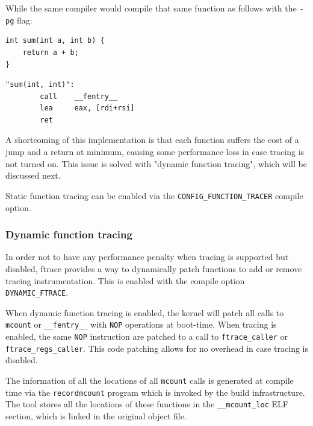 \noindent
\vspace{0.5em}

While the same compiler would compile that same function as follows with the
\verb|-pg| flag:

\vspace{0.5em}

\begin{minipage}[t]{0.47\textwidth}
\begin{verbatim}
int sum(int a, int b) {
    return a + b;
}
\end{verbatim}
\end{minipage}%
\hfill
\vrule %
\hfill
\begin{minipage}[t]{0.47\textwidth}
\begin{verbatim}
"sum(int, int)":
        call    __fentry__
        lea     eax, [rdi+rsi]
        ret
\end{verbatim}
\end{minipage}

\vspace{0.5em}

A shortcoming of this implementation is that each function suffers the cost of a
jump and a return at minimum, causing some performance loss in case tracing is
not turned on. This issue is solved with "dynamic function tracing", which will
be discussed next.

Static function tracing can be enabled via the \verb|CONFIG_FUNCTION_TRACER|
compile option.

\subsubsection*{Dynamic function tracing}

In order not to have any performance penalty when tracing is supported but
disabled, ftrace provides a way to dynamically patch functions to add or remove
tracing instrumentation. This is enabled with the compile option
\verb|DYNAMIC_FTRACE|.

When dynamic function tracing is enabled, the kernel will patch all calls to
\verb|mcount| or \verb|__fentry__| with \verb|NOP| operations at boot-time. When
tracing is enabled, the same \verb|NOP| instruction are patched to a call to
\verb|ftrace_caller| or \verb|ftrace_regs_caller|. This code patching allows for
no overhead in case tracing is disabled.

The information of all the locations of all \verb|mcount| calls is generated at
compile time via the \verb|recordmcount| program which is invoked by the build
infrastructure. The tool stores all the locations of these functions in the
\verb|__mcount_loc| ELF section, which is linked in the original object file.

